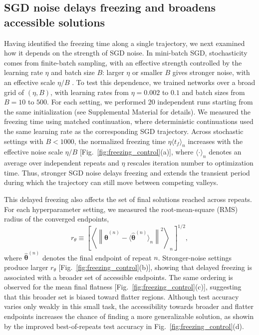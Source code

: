 \documentclass[aps,prx,reprint,superscriptaddress,longbibliography,nofootinbib,floatfix]{revtex4-2}
\begin{document}
\subsection{SGD noise delays freezing and broadens accessible solutions}
Having identified the freezing time along a single trajectory, we next examined how it depends on the strength of SGD noise. In mini-batch SGD, stochasticity comes from finite-batch sampling, with an effective strength controlled by the learning rate $\eta$ and batch size $B$: larger $\eta$ or smaller $B$ gives stronger noise, with an effective scale $\eta/B$ \cite{jastrzebskiThreeFactorsInfluencing2018}. To test this dependence, we trained networks over a broad grid of $(\eta,B)$, with learning rates from $\eta=0.002$ to $0.1$ and batch sizes from $B=10$ to $500$. For each setting, we performed 20 independent runs starting from the same initialization (see Supplemental Material for details). We measured the freezing time using matched continuation, where deterministic continuations used the same learning rate as the corresponding SGD trajectory. Across stochastic settings with $B<1000$, the normalized freezing time $\eta \langle t_f \rangle_n$ increases with the effective noise scale $\eta/B$ [Fig.~\ref{fig:freezing_control}(a)], where $\langle\cdot\rangle_n$ denotes an average over independent repeats and $\eta$ rescales iteration number to optimization time. Thus, stronger SGD noise delays freezing and extends the transient period during which the trajectory can still move between competing valleys.

This delayed freezing also affects the set of final solutions reached across repeats. For each hyperparameter setting, we measured the root-mean-square (RMS) radius of the converged endpoints,
\begin{equation} r_\theta \equiv \left[ \left\langle \left\| \hat{\bm{\theta}}^{(n)} - \langle\hat{\bm{\theta}}^{(n)}\rangle_n \right\|^2 \right\rangle_n \right]^{1/2}, 
\end{equation}
where $\hat{\bm{\theta}}^{(n)}$ denotes the final endpoint of repeat $n$. Stronger-noise settings produce larger $r_\theta$ [Fig.~\ref{fig:freezing_control}(b)], showing that delayed freezing is associated with a broader set of accessible endpoints. The same ordering is observed for the mean final flatness [Fig.~\ref{fig:freezing_control}(c)], suggesting that this broader set is biased toward flatter regions. Although test accuracy varies only weakly in this small task, the accessibility towards broader and flatter endpoints increases the chance of finding a more generalizable solution, as showin by the improved best-of-repeats test accuracy in Fig.~\ref{fig:freezing_control}(d).
\end{document}
